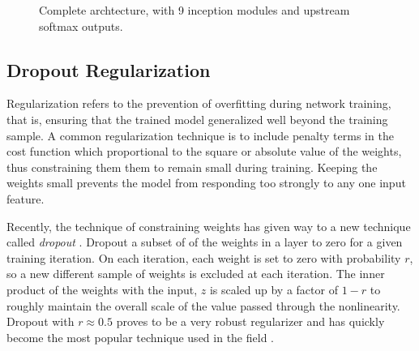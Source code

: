 \begin{figure}[t]
\begin{center}
  \end{center}
  \caption[Complete \googlenet architecture]{Complete \googlenet archtecture, with 9 inception modules and upstream softmax outputs.}
  \label{googlenet}
\end{figure}

\subsection{Dropout Regularization}

Regularization refers to the prevention of overfitting during network training, that is, ensuring that the trained model generalized well beyond the training sample.
A common regularization technique is to include penalty terms in the cost function which proportional to the square or absolute value of the weights, thus constraining them them to remain small during training.
Keeping the weights small prevents the model from responding too strongly to any one input feature.

Recently, the technique of constraining weights has given way to a new technique called \textit{dropout} \cite{hinton2014dropout}.
Dropout a subset of of the weights in a layer to zero for a given training iteration.  On each iteration, each weight is set to zero with probability $r$, so a new different sample of weights is excluded at each iteration.
The inner product of the weights with the input, $z$ is scaled up by a factor of $1-r$ to roughly maintain the overall scale of the value passed through the nonlinearity.
Dropout with $r\approx 0.5$ proves to be a very robust regularizer and has quickly become the most popular technique used in the field \cite{lecun2015deep}.


